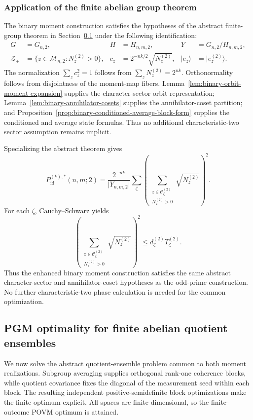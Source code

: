 \documentclass[11pt]{article}
\newcommand{\1}{\mathbf 1}
\newcommand{\ket}[1]{\lvert #1\rangle}
\theoremstyle{plain}
\theoremstyle{definition}
\theoremstyle{remark}
\begin{document}
\subsubsection{Application of the finite abelian group theorem}
The binary moment construction satisfies the hypotheses of the abstract
finite-group theorem in Section~\ref{sec:seed-sdp} under the following
identification:
\begin{align}
 G&=G_{n,2},&
 H&=H_{n,m,2},&
 Y&=G_{n,2}/H_{n,m,2},
 \label{eq:binary-abstract-dictionary-groups}\\
 \mathcal Z_+
 &=\{z\in\mathcal M_{n,2}:N_z^{(2)}>0\},&
 c_z&=2^{-nk/2}\sqrt{N_z^{(2)}},&
 \ket{e_z}&=\ket{e_z^{(2)}}.
 \label{eq:binary-abstract-dictionary-sectors}
\end{align}
The normalization $\sum_zc_z^2=1$ follows from
$\sum_zN_z^{(2)}=2^{nk}$.  Orthonormality follows from disjointness of the moment-map fibers.
Lemma~\ref{lem:binary-orbit-moment-expansion} supplies the character-sector
orbit representation; Lemma~\ref{lem:binary-annihilator-cosets} supplies the
annihilator-coset partition; and
Proposition~\ref{prop:binary-conditioned-average-block-form} supplies the
conditioned and average state formulas.  Thus no additional characteristic-two
sector assumption remains implicit.

Specializing the abstract theorem gives
\begin{equation}
 P_{\mathrm{id}}^{(k),*}(n,m;2)
 =\frac{2^{-nk}}{\lvert Y_{n,m,2}\rvert}
 \sum_\zeta\left(
 \sum_{\substack{z\in\mathcal C_\zeta^{(2)}\\N_z^{(2)}>0}}
 \sqrt{N_z^{(2)}}
 \right)^2.
 \label{eq:integrated-qubit-finite-pgm}
\end{equation}
For each $\zeta$, Cauchy--Schwarz yields
\begin{equation}
 \left(
 \sum_{\substack{z\in\mathcal C_\zeta^{(2)}\\N_z^{(2)}>0}}
 \sqrt{N_z^{(2)}}
 \right)^2
 \le d_\zeta^{(2)}T_\zeta^{(2)}.
 \label{eq:integrated-qubit-CS}
\end{equation}
Thus the enhanced binary moment construction satisfies the same abstract  
character-sector and annihilator-coset hypotheses as the odd-prime  
construction.  No further characteristic-two phase calculation is needed for  
the common optimization.  

\subsection{PGM optimality for finite abelian quotient ensembles}
\label{sec:seed-sdp}
We now solve the abstract quotient-ensemble problem common to both moment
realizations.  Subgroup averaging supplies orthogonal rank-one coherence
blocks, while quotient covariance fixes the diagonal of the measurement seed
within each block.  The resulting independent positive-semidefinite block
optimizations make the finite optimum explicit.  All spaces are finite
dimensional, so the finite-outcome POVM optimum is attained.
\end{document}
